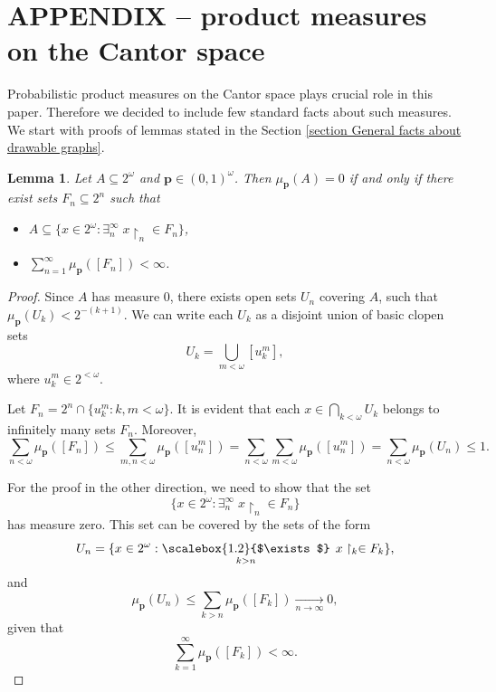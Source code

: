 \documentclass{amsart}
\theoremstyle{plain}
\newtheorem*{lemma*}{Lemma}
\theoremstyle{definition}
\theoremstyle{remark}
\numberwithin{equation}{section}
\newcommand{\s}{\subseteq}
\begin{document}
\section{APPENDIX -- product measures on the Cantor space}\label{section APPENDIX}

Probabilistic product measures on the Cantor space plays crucial role in this paper. Therefore we decided to include few standard facts about such measures. We start with proofs of lemmas stated in the Section \ref{section General facts about drawable graphs}.

\begin{lemma*}
    Let $A\s 2^\omega$ and $\textbf{p}\in (0,1)^\omega$. %
    Then $\mu_{\textbf{p}}(A)=0$ if and only if there exist sets $F_n \s 2^n$ such that
    \begin{itemize}
        \item $A\s \{x \in 2^\omega : \exists_n^\infty \; x \restriction_n \in F_n\}$,
        \item $\sum\limits_{n=1}^{\infty}\mu_{\textbf{p}}([F_n])<\infty$.
    \end{itemize}
\end{lemma*}
\begin{proof}
    Since $A$ has measure $0$, there exists open sets $U_n$ covering $A$, such that $\mu_{\textbf{p}}(U_k)<2^{-(k+1)}$. We can write each $U_k$ as a disjoint union of basic clopen sets
    $$U_k=\bigcup\limits_{m<\omega}[u_k^m],$$
    where $u_k^m\in 2^{<\omega}$.
    
    Let $F_n=2^n\cap\{u_k^m : k,m<\omega\}$.
    It is evident that each $x \in \bigcap\limits_{k<\omega}U_k$ belongs to infinitely many sets $F_n$. Moreover,
    $$\sum\limits_{n<\omega}\mu_{\textbf{p}}([F_n])\leq \sum\limits_{m,n<\omega}\mu_{\textbf{p}}([u_n^m])=\sum\limits_{n<\omega}\sum\limits_{m<\omega}\mu_{\textbf{p}}([u_n^m])=\sum\limits_{n<\omega}\mu_{\textbf{p}}(U_n)\leq 1.$$

    For the proof in the other direction, we need to show that the set
    $$\{x \in 2^\omega : \exists_n^\infty \; x \restriction_n \in F_n\}$$
    has measure zero. This set can be covered by the sets of the form
    $$U_n=\{x \in 2^\omega : 
    \mathop{\scalebox{1.2}{$\exists$}}\limits_{k>n} 
    \; x \restriction_k \in F_k\},$$
    and 
    $$\mu_{\mathbf{p}}(U_n)\leq \sum\limits_{k>n}\mu_{\mathbf{p}}([F_k])\xrightarrow[n\rightarrow \infty]{}0,$$
    given that
    $$\sum\limits_{k=1}^{\infty}\mu_{\textbf{p}}([F_k])<\infty.$$
\end{proof}
\end{document}
